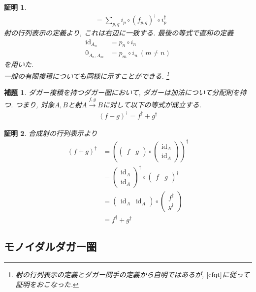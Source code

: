 \documentclass[a4paper,12pt]{ltjsarticle}
\theoremstyle{break}
\newtheorem{lem}[thm]{補題}
\newtheorem*{prf}{証明}
\newcommand{\xr}[1]{\xrightarrow{#1}}
\newcommand{\id}{\mathrm{id}}
\newcommand{\ci}{\circ}
\newcommand{\da}{\dagger}
\numberwithin{equation}{section}
\begin{document}
\begin{prf}
\begin{align*}
    &= \sum_{p,q} i_p \ci (f_{p,q})^\da \ci i_p^\da 
  \end{align*}
  射の行列表示の定義より, これは右辺に一致する. 
  最後の等式で直和の定義
  \begin{align*}
    \id_{A_n}&=p_n \ci i_n \\
    0_{A_n,A_m}&=p_m \ci i_n~(m \neq n)
  \end{align*}
  を用いた. \\
  一般の有限複積についても同様に示すことができる.
  \footnote{
    射の行列表示の定義とダガー関手の定義から自明ではあるが, $\cite{cfqt}$に従って証明をおこなった. 
  } 
\end{prf}

\begin{lem}
  ダガー複積を持つダガー圏において, ダガーは加法について分配則を持つ. 
  つまり, 対象$A,B$と射$A \xr{f,g} B$に対して以下の等式が成立する.
  \begin{align*}
    (f+g)^\da = f^\da + g^\da
  \end{align*}
\end{lem}

\begin{prf}
  合成射の行列表示より
  \begin{align*}
    (f+g)^\da
    &= \left( 
      \begin{pmatrix}
      f & g
    \end{pmatrix} \ci 
    \begin{pmatrix}
      \id_A \\
      \id_A
    \end{pmatrix}\right)^\da \\
    &= \begin{pmatrix}
      \id_A \\
      \id_A
    \end{pmatrix}^\da
    \ci \begin{pmatrix}
      f & g
    \end{pmatrix}^\da \\
    &= \begin{pmatrix}
      \id_A & \id_A
    \end{pmatrix} \ci 
    \begin{pmatrix}
      f^\da \\
      g^\da
    \end{pmatrix} \\
    &= f^\da + g^\da
  \end{align*}
\end{prf}

\subsection{モノイダルダガー圏}
\end{document}
